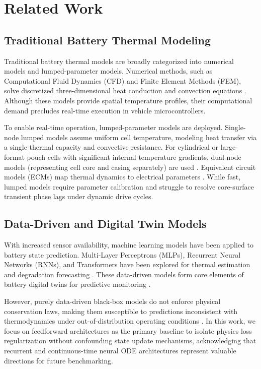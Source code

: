 \section{Related Work}

\subsection{Traditional Battery Thermal Modeling}
Traditional battery thermal models are broadly categorized into numerical models and lumped-parameter models. Numerical methods, such as Computational Fluid Dynamics (CFD) and Finite Element Methods (FEM), solve discretized three-dimensional heat conduction and convection equations \cite{zhang2017surrogate, ouyang2022surrogate}. Although these models provide spatial temperature profiles, their computational demand precludes real-time execution in vehicle microcontrollers. 

To enable real-time operation, lumped-parameter models are deployed. Single-node lumped models assume uniform cell temperature, modeling heat transfer via a single thermal capacity and convective resistance. For cylindrical or large-format pouch cells with significant internal temperature gradients, dual-node models (representing cell core and casing separately) are used \cite{saha2014lumped}. Equivalent circuit models (ECMs) map thermal dynamics to electrical parameters \cite{kaliaperumal2024thermal, xie2021enhanced, li2021novel}. While fast, lumped models require parameter calibration and struggle to resolve core-surface transient phase lags under dynamic drive cycles.

\subsection{Data-Driven and Digital Twin Models}
With increased sensor availability, machine learning models have been applied to battery state prediction. Multi-Layer Perceptrons (MLPs), Recurrent Neural Networks (RNNs), and Transformers have been explored for thermal estimation and degradation forecasting \cite{saravanan2022machine}. These data-driven models form core elements of battery digital twins for predictive monitoring \cite{lyu2024digitaltwin, patil2024review, semeraro2024battery, li2021review}. 

However, purely data-driven black-box models do not enforce physical conservation laws, making them susceptible to predictions inconsistent with thermodynamics under out-of-distribution operating conditions \cite{li2021review}. In this work, we focus on feedforward architectures as the primary baseline to isolate physics loss regularization without confounding state update mechanisms, acknowledging that recurrent and continuous-time neural ODE architectures represent valuable directions for future benchmarking.

